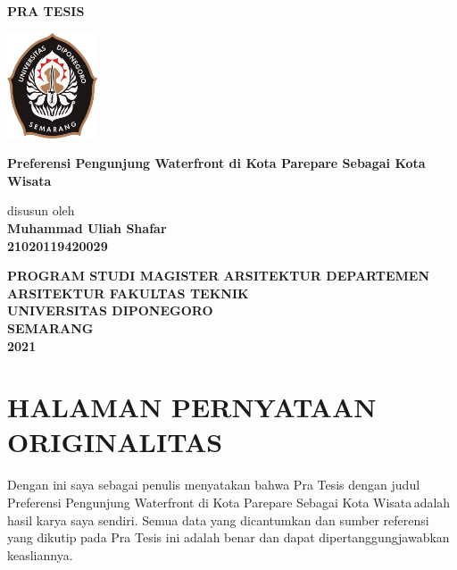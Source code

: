 \documentclass[12pt,oneside]{udthesis}\usepackage[]{graphicx}\usepackage[]{color}
\def \title{PRA TESIS}
\def \subtitle{Preferensi Pengunjung Waterfront di Kota Parepare Sebagai Kota Wisata}
\def \yourName{Muhammad Uliah Shafar}
\def \yourIdentifier{21020119420029}
\begin{document}
\begin{titlepage}
	\begin{center}

\mbox{}\vfill

  {\bf \title \par}

    \vspace{3\baselineskip}
		\includegraphics[width=0.20\textwidth]{figures/logo}

    \vspace{3\baselineskip}

		{\large\bf\MakeUppercase \subtitle}

    \vspace{3\baselineskip}
    disusun oleh\\
        {\bf
           {\MakeUppercase\yourName}\\
           \yourIdentifier
        }

    \vspace{3\baselineskip}
		{\large\bf PROGRAM STUDI MAGISTER ARSITEKTUR DEPARTEMEN ARSITEKTUR FAKULTAS TEKNIK\\ UNIVERSITAS DIPONEGORO\\
			SEMARANG\\
			2021
		}
	\end{center}
\vfill\mbox{}

\end{titlepage}

\chapter*{HALAMAN PERNYATAAN ORIGINALITAS}
\begin{center}
 Dengan ini saya sebagai penulis menyatakan bahwa Pra Tesis dengan judul \subtitle\,adalah hasil karya saya sendiri. Semua data yang dicantumkan dan sumber referensi yang dikutip pada Pra Tesis ini adalah benar dan dapat dipertanggungjawabkan keasliannya.
\end{center}

\vspace{8\baselineskip}
\end{document}
